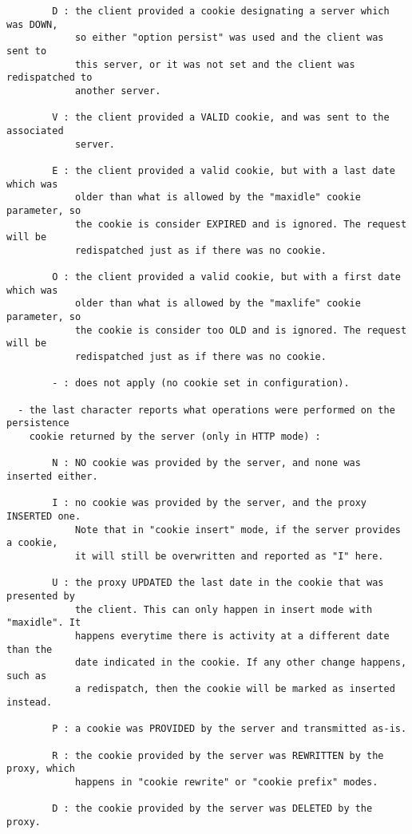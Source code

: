 \begin{verbatim}
        D : the client provided a cookie designating a server which was DOWN,
            so either "option persist" was used and the client was sent to
            this server, or it was not set and the client was redispatched to
            another server.

        V : the client provided a VALID cookie, and was sent to the associated
            server.

        E : the client provided a valid cookie, but with a last date which was
            older than what is allowed by the "maxidle" cookie parameter, so
            the cookie is consider EXPIRED and is ignored. The request will be
            redispatched just as if there was no cookie.

        O : the client provided a valid cookie, but with a first date which was
            older than what is allowed by the "maxlife" cookie parameter, so
            the cookie is consider too OLD and is ignored. The request will be
            redispatched just as if there was no cookie.

        - : does not apply (no cookie set in configuration).

  - the last character reports what operations were performed on the persistence
    cookie returned by the server (only in HTTP mode) :

        N : NO cookie was provided by the server, and none was inserted either.

        I : no cookie was provided by the server, and the proxy INSERTED one.
            Note that in "cookie insert" mode, if the server provides a cookie,
            it will still be overwritten and reported as "I" here.

        U : the proxy UPDATED the last date in the cookie that was presented by
            the client. This can only happen in insert mode with "maxidle". It
            happens everytime there is activity at a different date than the
            date indicated in the cookie. If any other change happens, such as
            a redispatch, then the cookie will be marked as inserted instead.

        P : a cookie was PROVIDED by the server and transmitted as-is.

        R : the cookie provided by the server was REWRITTEN by the proxy, which
            happens in "cookie rewrite" or "cookie prefix" modes.

        D : the cookie provided by the server was DELETED by the proxy.


\end{verbatim}
